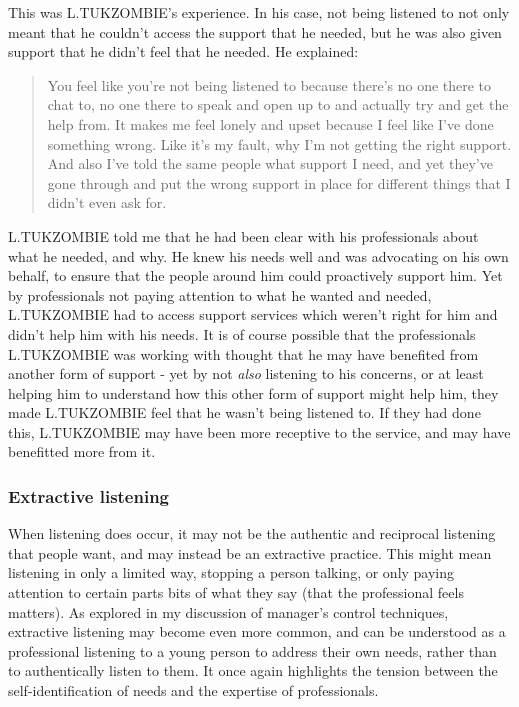 This was L.TUKZOMBIE’s experience. In his case, not being listened to not only meant that he couldn’t access the support that he needed, but he was also given support that he didn’t feel that he needed. He explained: 
\begin{quote}
You feel like you're not being listened to because there's no one there to chat to, no one there to speak and open up to and actually try and get the help from. It makes me feel lonely and upset because I feel like I've done something wrong. Like it's my fault, why I'm not getting the right support. And also I've told the same people what support I need, and yet they've gone through and put the wrong support in place for different things that I didn't even ask for.
\end{quote}
L.TUKZOMBIE told me that he had been clear with his professionals about what he needed, and why. He knew his needs well and was advocating on his own behalf, to ensure that the people around him could proactively support him. Yet by professionals not paying attention to what he wanted and needed, L.TUKZOMBIE had to access support services which weren't right for him and didn't help him with his needs. It is of course possible that the professionals L.TUKZOMBIE was working with thought that he may have benefited from another form of support - yet by not \emph{also} listening to his concerns, or at least helping him to understand how this other form of support might help him, they made L.TUKZOMBIE feel that he wasn't being listened to. If they had done this, L.TUKZOMBIE may have been more receptive to the service, and may have benefitted more from it.

\subsubsection{Extractive listening}
When listening does occur, it may not be the authentic and reciprocal listening that people want, and may instead be an extractive practice. This might mean listening in only a limited way, stopping a person talking, or only paying attention to certain parts bits of what they say (that the professional feels matters). As explored in my discussion of manager's control techniques, extractive listening may become even more common, and can be understood as a professional listening to a young person to address their own needs, rather than to authentically listen to them. It once again highlights the tension between the self-identification of needs and the expertise of professionals. 

